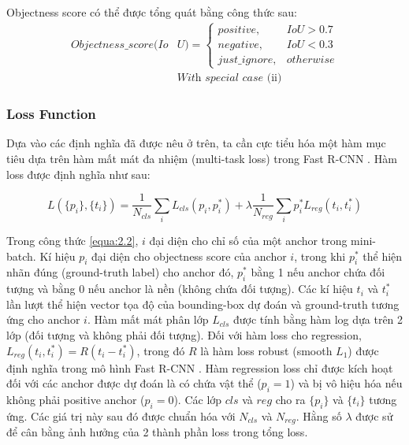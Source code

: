 Objectness score có thể được tổng quát bằng công thức sau:
\begin{equation}
	\begin{split}
	Objectness\_score(Io&U) = \begin{cases}
								positive, & IoU > 0.7 \\
								negative, & IoU < 0.3 \\
								just\_ignore, & otherwise 
							\end{cases} \\
	&\textit{With special case } \text{(ii)}
	\end{split}
\end{equation}
\vspace{-.5cm}


\subsubsection*{Loss Function}
Dựa vào các định nghĩa đã được nêu ở trên, ta cần cực tiểu hóa một hàm mục tiêu dựa trên hàm mất mát đa nhiệm (multi-task loss) trong Fast R-CNN \citep{Girshick_2015_ICCV}. Hàm loss được định nghĩa như sau:

\begin{equation}
	L(\{p_i\}, \{t_i\}) = \dfrac{1}{N_{cls}} \sum_i L_{cls}(p_i, p_i^*) + \lambda \dfrac{1}{N_{reg}} \sum_i p_i^* L_{reg} (t_i, t_i^*)
	\label{equa:2.2}
\end{equation}

Trong công thức \ref{equa:2.2}, $i$ đại diện cho chỉ số của một anchor trong mini-batch. Kí hiệu $p_i$ đại diện cho objectness score của anchor $i$, trong khi $p_i^*$ thể hiện nhãn đúng (ground-truth label) cho anchor đó, $p_i^*$ bằng 1 nếu anchor chứa đối tượng và bằng 0 nếu anchor là nền (không chứa đối tượng). Các kí hiệu $t_i$ và $t_i^*$ lần lượt thể hiện vector tọa độ của bounding-box dự đoán và ground-truth tương ứng cho anchor $i$. Hàm mất mát phân lớp $L_{cls}$ được tính bằng hàm log dựa trên 2 lớp (đối tượng và không phải đối tượng). Đối với hàm loss cho regression, $L_{reg}(t_i, t_i^*) = R(t_i - t_i^*)$, trong đó $R$ là hàm loss robust (smooth $L_1$) được định nghĩa trong mô hình Fast R-CNN \citep{Girshick_2015_ICCV}. Hàm regression loss chỉ được kích hoạt đối với các anchor được dự đoán là có chứa vật thể ($p_i = 1$) và bị vô hiệu hóa nếu không phải positive anchor ($p_i=0$). Các lớp $cls$ và $reg$ cho ra $\{p_i\}$ và $\{t_i\}$ tương ứng. Các giá trị này sau đó được chuẩn hóa với $N_{cls}$ và $N_{reg}$. Hằng số $\lambda$ được sử để cân bằng ảnh hưởng của 2 thành phần loss trong tổng loss.

